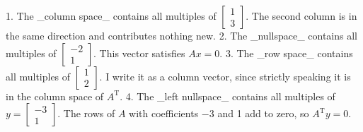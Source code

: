1. The _column space_ contains all multiples of \(\begin{bmatrix}1\\ 3\end{bmatrix}\). The second column is in the same direction and contributes nothing new.
2. The _nullspace_ contains all multiples of \(\begin{bmatrix}-2\\ 1\end{bmatrix}\). This vector satisfies \(Ax=0\).
3. The _row space_ contains all multiples of \(\begin{bmatrix}1\\ 2\end{bmatrix}\). I write it as a column vector, since strictly speaking it is in the column space of \(A^{\mathrm{T}}\).
4. The _left nullspace_ contains all multiples of \(y=\begin{bmatrix}-3\\ 1\end{bmatrix}\). The rows of \(A\) with coefficients \(-3\) and 1 add to zero, so \(A^{\mathrm{T}}y=0\).

 